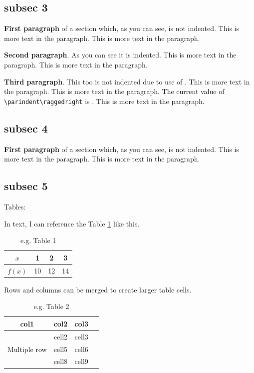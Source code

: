 \documentclass [12pt, a4paper] {article}
\begin{document}
\setlength{\parindent}{15pt} %
\setlength{\parskip}{0.5em} %

\subsection*{subsec 3}
\textbf{First paragraph} of a section which, as you can see, is not indented. This is more text in the paragraph. This is more text in the paragraph.

\textbf{Second paragraph}. As you can see it is indented. This is more text in the paragraph. This is more text in the paragraph. 

\noindent\textbf{Third paragraph}. This too is not indented due to use of \texttt{\string\noindent}. This is more text in the paragraph. This is more text in the paragraph.  The current value of \verb|\parindent\raggedright| is \the\parindent. This is more text in the paragraph.

\subsection*{subsec 4}
\textbf{First paragraph} of a section which, as you can see, is not indented. This is more text in the paragraph. This is more text in the paragraph.
\lipsum[]

\subsection{subsec 5}

Tables:

In text, I can reference the Table \ref{tab:my_label1} like this.

\begin{table}[ht]
    \centering
    \begin{tabular}{|c||c|c|c|}
    \hline
    $x$     & 1  & 2  & 3  \\ 
    \hline
    $f(x)$  & 10 & 12 & 14 \\ 
    \hline
    \end{tabular}
    \caption{e.g. Table 1}
    \label{tab:my_label1}
\end{table}

Rows and columns can be merged to create larger table cells. 

\begin{table}[ht]
\begin{center}
\begin{tabular}{ |c|c|c|c| } 
\hline
col1 & col2 & col3 \\
\hline
\multirow{3}{4em}{Multiple row} & cell2 & cell3 \\ 
& cell5 & cell6 \\ 
& cell8 & cell9 \\ 
\hline
\end{tabular}
\end{center}
\caption{e.g. Table 2}
\label{tab:my_label2}
\end{table}
\end{document}
